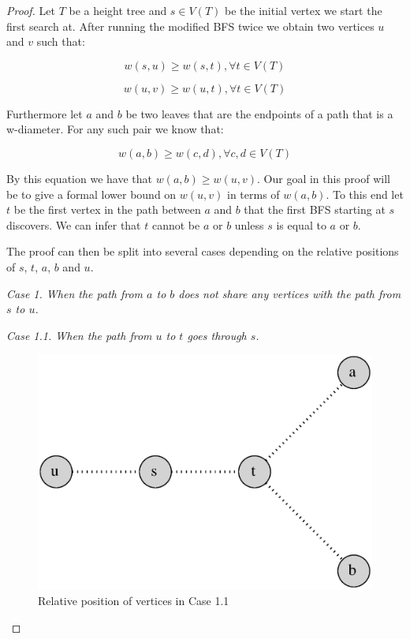 \begin{proof}
Let $T$ be a height tree and $s \in V(T)$ be the initial vertex we start the first search at. After running the modified BFS twice we obtain two vertices $u$ and $v$ such that:

\begin{equation}
    \label{eq:su_all}
    w(s, u) \ge w(s, t), \forall t \in V(T)
\end{equation}

\begin{equation}
    \label{eq:uv_all}
    w(u, v) \ge w(u, t), \forall t \in V(T)
\end{equation}

Furthermore let $a$ and $b$ be two leaves that are the endpoints of a path that is a w-diameter. For any such pair we know that:

\begin{equation}
    \label{eq:ab_all}
    w(a, b) \ge w(c, d), \forall c, d \in V(T)
\end{equation}

By this equation we have that $w(a, b) \ge w(u, v)$. Our goal in this proof will be to give a formal lower bound on $w(u, v)$ in terms of $w(a, b)$. To this end let $t$ be the first vertex in the path between $a$ and $b$ that the first BFS starting at $s$ discovers. We can infer that $t$ cannot be $a$ or $b$ unless $s$ is equal to $a$ or $b$.

The proof can then be split into several cases depending on the relative positions of $s$, $t$, $a$, $b$ and $u$. \linebreak

{\em Case 1. When the path from $a$ to $b$ does not share any vertices with the path from $s$ to $u$.}

{\em Case 1.1. When the path from $u$ to $t$ goes through $s$.}


\begin{figure}%
    \centering
    \includegraphics[center, scale=0.5 ]{./images/2xbfs-case-1-1.eps}
    \caption{Relative position of vertices in Case 1.1 }%
    \label{fig:case1.1}%
\end{figure}


\end{proof}
